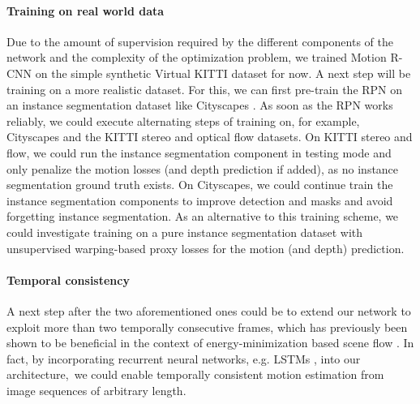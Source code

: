 \paragraph{Training on real world data}
Due to the amount of supervision required by the different components of the network
and the complexity of the optimization problem,
we trained Motion R-CNN on the simple synthetic Virtual KITTI dataset for now.
A next step will be training on a more realistic dataset.
For this, we can first pre-train the RPN on an instance segmentation dataset like
Cityscapes \cite{Cityscapes}. As soon as the RPN works reliably, we could execute alternating
steps of training on, for example, Cityscapes and the KITTI stereo and optical flow datasets.
On KITTI stereo and flow, we could run the instance segmentation component in testing mode and only penalize
the motion losses (and depth prediction if added), as no instance segmentation ground truth exists.
On Cityscapes, we could continue train the instance segmentation components to
improve detection and masks and avoid forgetting instance segmentation.
As an alternative to this training scheme, we could investigate training on a pure
instance segmentation dataset with unsupervised warping-based proxy losses for the motion (and depth) prediction.

\paragraph{Temporal consistency}
A next step after the two aforementioned ones could be to extend our network to exploit more than two
temporally consecutive frames, which has previously been shown to be beneficial in the
context of energy-minimization based scene flow \cite{TemporalSF}.
In fact, by incorporating recurrent neural networks, e.g. LSTMs \cite{LSTM},
into our architecture, we could enable temporally consistent motion estimation
from image sequences of arbitrary length.

